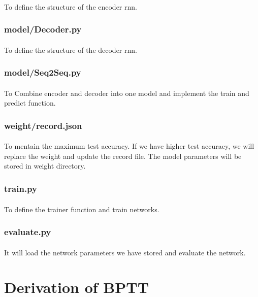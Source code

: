 \paragraph{}
To define the structure of the encoder rnn.
\subsubsection{model/Decoder.py}
\paragraph{}
To define the structure of the decoder rnn.
\subsubsection{model/Seq2Seq.py}
\paragraph{}
To Combine encoder and decoder into one model and implement the train and predict function.
\subsubsection{weight/record.json}
\paragraph{}
To mentain the maximum test accuracy. If we have higher test accuracy, we will replace the weight and update the record file. The model parameters will be stored in weight directory.
\subsubsection{train.py}
\paragraph{}
To define the trainer function and train networks.
\subsubsection{evaluate.py}
\paragraph{}
It will load the network parameters we have stored and evaluate the network.
\section{Derivation of BPTT}
